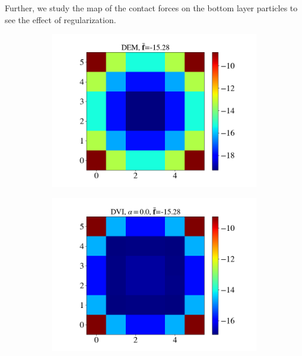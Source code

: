\begin{itemize}
	Further, we study the map of the contact forces on the bottom layer particles to see the effect of regularization. 
	\begin{figure}[H]
		\centering	
		\begin{subfigure}{0.32\columnwidth}	
			\centering
			\includegraphics[width=1.0\textwidth]{images/CD/Example7/5/N_6_DEM_0.png}
		\end{subfigure}
		\begin{subfigure}{0.32\columnwidth}	
			\centering
			\includegraphics[width=1.0\textwidth]{images/CD/Example7/5/N_6_DVI_0.0.png}
		\end{subfigure}
		\begin{subfigure}{0.32\columnwidth}	
			\centering

\end{subfigure}
\end{figure}
\end{itemize}
